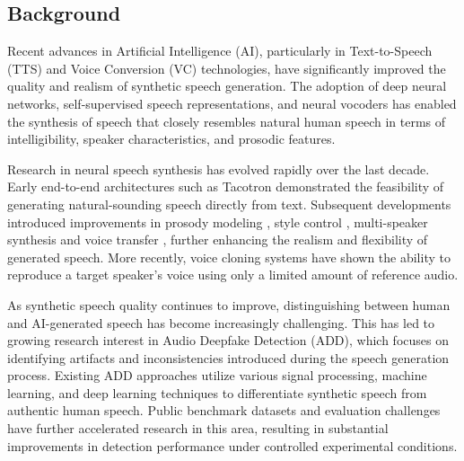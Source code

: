 \subsection{Background}

Recent advances in Artificial Intelligence (AI), particularly in Text-to-Speech (TTS) and Voice Conversion (VC) technologies, have significantly improved the quality and realism of synthetic speech generation. The adoption of deep neural networks, self-supervised speech representations, and neural vocoders has enabled the synthesis of speech that closely resembles natural human speech in terms of intelligibility, speaker characteristics, and prosodic features.

Research in neural speech synthesis has evolved rapidly over the last decade. Early end-to-end architectures such as Tacotron \cite{tacotron2017} demonstrated the feasibility of generating natural-sounding speech directly from text. Subsequent developments introduced improvements in prosody modeling \cite{prosody2018}, style control \cite{styletokens2018}, multi-speaker synthesis and voice transfer \cite{transfer2018}, further enhancing the realism and flexibility of generated speech. More recently, voice cloning systems have shown the ability to reproduce a target speaker’s voice using only a limited amount of reference audio.

As synthetic speech quality continues to improve, distinguishing between human and AI-generated speech has become increasingly challenging. This has led to growing research interest in Audio Deepfake Detection (ADD), which focuses on identifying artifacts and inconsistencies introduced during the speech generation process. Existing ADD approaches utilize various signal processing, machine learning, and deep learning techniques to differentiate synthetic speech from authentic human speech. Public benchmark datasets and evaluation challenges have further accelerated research in this area, resulting in substantial improvements in detection performance under controlled experimental conditions.
